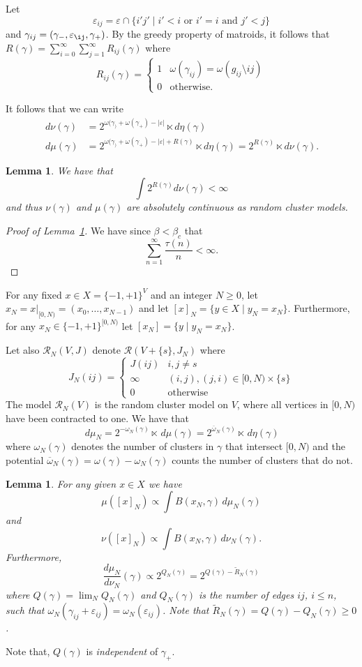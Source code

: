 \documentclass[11pt, a4paper, oneside]{article}
\newtheorem{lemma}[thm]{Lemma}
\theoremstyle{definition}
\theoremstyle{remark}
\renewcommand{\d}{\,d}
\providecommand{\dd}[2]{\dfrac{d#1}{d#2}}
\providecommand{\mscr}{\mathscr}
\providecommand{\ol}{\overline}
\providecommand{\e}{\epsilon}
\providecommand{\tl}{\tilde}
\providecommand{\g}{\gamma}
\providecommand{\w}{\omega}
\def\e{\varepsilon}
\begin{document}
Let
$$\e_{ij} = \e \cap \{i'j' \mid i' < i \text{ or } i' = i \text{ and } j' < j\} $$
and $\g_{ij}=(\g_-,\e_{\ij},\g_+)$. By the greedy property of matroids, it
follows that $R(\g) = \sum_{i=0}^\infty\sum_{j=1}^\infty R_{ij}(\g)$ where
$$ R_{ij}(\g) =
  \begin{cases}
    1 & \w(\g_{ij}) = \w(g_{ij}\setminus {ij}) \\
    0 & \text{otherwise.}
  \end{cases}
$$

It follows that we can write
\begin{align}
  \d\nu(\g) &= 2^{\w(\g_)+\w(\g_+) - |\e|} \ltimes d\eta(\g) \\
  \d\mu(\g) &= 2^{\w(\g_)+\w(\g_+) - |\e|+R(\g)} \ltimes d\eta(\g)
              = 2^{R(\g)} \ltimes d\nu(\g).
\end{align}

\begin{lemma}\label{lem:RL1}
  We have that
  \[
    \int 2^{R(\g)} d\nu(\g) < \infty
  \]
  and thus $\nu(\g)$ and $\mu(\g)$ are absolutely continuous as random cluster
  models.
\end{lemma}
\begin{proof}[Proof of Lemma~\ref{lem:RL1}]

  We have since $\beta<\beta_c$ that
  \[
    \sum_{n=1}^{\infty} \frac{\tau(n)}{n} < \infty.
  \]

\end{proof}


For any fixed $x\in X=\{-1,+1\}^V$ and an integer $N\ge 0$, let
$x_N=x\vert_{[0,N)} = (x_0,\dots, x_{N-1})$ and let
$[x]_N = \{y\in X\mid y_N = x_N\}$. Furthermore, for any
$x_N\in \{-1,+1\}^{[0,N)}$ let $[x_N]=\{y\mid y_N = x_N\}$.

Let also $\mscr R_N(V,J)$ denote $\mscr R(V+\{s\},J_N)$ where
$$
J_N(ij) =
\begin{cases} J(ij) & i,j\not= s \\
  \infty & (i,j),(j,i)\in [0,N)\times \{s\} \\
  0 & \text{otherwise}
\end{cases}
$$
The model $\mscr R_N(V)$ is the random cluster model on $V$, where all vertices
in $[0,N)$ have been contracted to one. We have that
$$
\d\mu_N = 2^{-\w_N(\g)} \ltimes \d\mu(\g) = 2^{\ol\w_N(\g)} \ltimes \d\eta(\g)
$$
where $\w_N(\g)$ denotes the number of clusters in $\g$ that intersect $[0,N)$
and the potential $\ol\w_N(\g) = \w(\g)-\w_N(\g)$ counts the number of clusters
that do not.
\begin{lemma}\label{lem:cyprob}
  For any given $x\in X$ we have
  $$ \mu([x]_N) \propto \int B(x_N,\gamma) \d\mu_N(\gamma) $$
  and
  $$ \nu([x]_N) \propto \int B(x_N,\gamma) \d\nu_N(\gamma). $$
  Furthermore,
  $$
  \dd{\mu_N}{\nu_N}(\g) \propto 2^{Q_N(\g)} = 2^{Q(\gamma)-\tl R_N(\gamma)}
  $$
  where $Q(\g)=\lim_N Q_N(\g)$ and $Q_N(\g)$ is the number of edges $ij$,
  $i\le n$, such that $\w_N(\g_{ij}+\e_{ij}) = \w_N(\e_{ij})$. Note that
  $\tl R_N(\g) = Q(\g) - Q_N(\g) \ge 0$.
\end{lemma}
Note that, $Q(\g)$ is \emph{independent} of $\g_+$.
\end{document}
